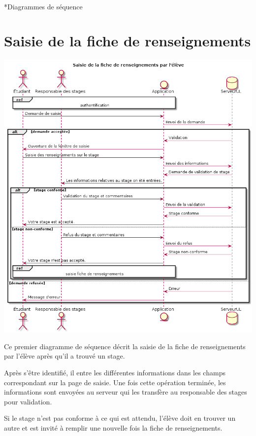 \documentclass[11pt, a4paper]{report}
\begin{document}
\let\clearpage

\chapter*{Diagrammes de séquence}

\section*{Saisie de la fiche de renseignements}
\centerline{\includegraphics[scale=0.55]{Images/saisieficherenseignements.png}}
\hspace{1cm}Ce premier diagramme de séquence décrit la saisie de la fiche de renseignements par l’élève après qu’il a trouvé un stage.\vspace{0.2cm}

\hspace{0.6cm}Après s’être identifié, il entre les différentes informations dans les champs correspondant sur la page de saisie. Une fois cette opération terminée, les informations sont envoyées au serveur qui les transfère au responsable des stages pour validation. \vspace{0.2cm}

\hspace{0.6cm}Si le stage n’est pas conforme à ce qui est attendu, l’élève doit en trouver un autre et est invité à remplir une nouvelle fois la fiche de renseignements.
\end{document}
